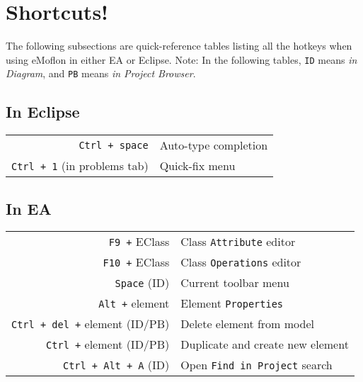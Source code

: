 \newpage
\section{Shortcuts!}
\genHeader

The following subsections are quick-reference tables listing all the hotkeys when using eMoflon in either EA or Eclipse. Note: In the following tables,
\texttt{ID} means \emph{in Diagram}, and \texttt{PB} means \emph{in Project Browser}.

\subsection{In Eclipse}

\begin{tabular}{r|l}
\texttt{Ctrl + space} & Auto-type completion\\
\texttt{Ctrl + 1} (in problems tab) & Quick-fix menu \\
%
\end{tabular}


\subsection{In EA}

\begin{tabular}{r|l}
\texttt{F9 +} EClass & Class \texttt{Attribute} editor \\
\texttt{F10 +} EClass & Class \texttt{Operations} editor \\
\texttt{Space} (ID) & Current toolbar menu \\
\texttt{Alt +} element & Element \texttt{Properties} \\
\texttt{Ctrl + del +} element (ID/PB) & Delete element from model\\
\texttt{Ctrl +} element (ID/PB) & Duplicate and create new element \\
\texttt{Ctrl + Alt + A} (ID) & Open \texttt{Find in Project} search \\
%
\end{tabular}
